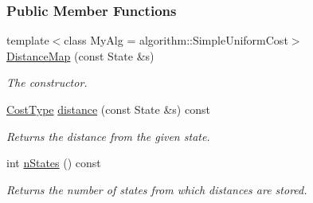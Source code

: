 \subsubsection*{Public Member Functions}
\begin{DoxyCompactItemize}
\item 
{\footnotesize template$<$class My\+Alg  = algorithm\+::\+Simple\+Uniform\+Cost$>$ }\\\hyperlink{structslb_1_1ext_1_1heuristic_1_1differential_1_1DistanceMap_3_01State_00_01Index_00_01IndexKind_1_1noInverse_01_4_aacdc18f08067c72e70fc47cbcda38994}{Distance\+Map} (const State \&s)
\begin{DoxyCompactList}\small\item\em The constructor. \end{DoxyCompactList}\item 
\hyperlink{structslb_1_1ext_1_1heuristic_1_1differential_1_1DistanceMap_3_01State_00_01Index_00_01IndexKind_1_1noInverse_01_4_a9a67ddc91fe4ea5fbf6957d2105ed5a7}{Cost\+Type} \hyperlink{structslb_1_1ext_1_1heuristic_1_1differential_1_1DistanceMap_3_01State_00_01Index_00_01IndexKind_1_1noInverse_01_4_ae7b3433931474cc6402ba6663495959b}{distance} (const State \&s) const 
\begin{DoxyCompactList}\small\item\em Returns the distance from the given state. \end{DoxyCompactList}\item 
int \hyperlink{structslb_1_1ext_1_1heuristic_1_1differential_1_1DistanceMap_3_01State_00_01Index_00_01IndexKind_1_1noInverse_01_4_a782b40376782f9ddcdade6257d3b7b37}{n\+States} () const 
\begin{DoxyCompactList}\small\item\em Returns the number of states from which distances are stored. \end{DoxyCompactList}\end{DoxyCompactItemize}
